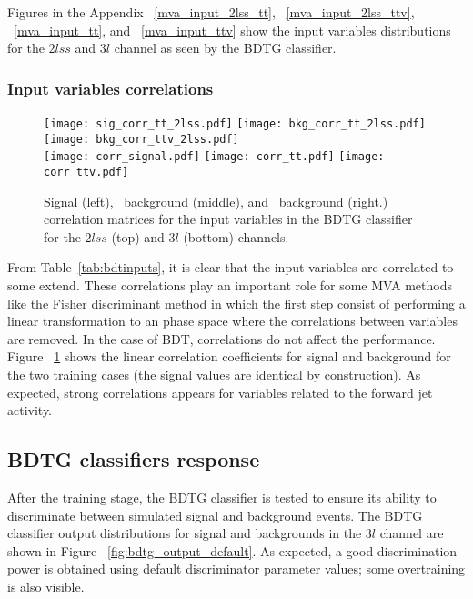 Figures in the Appendix ~\ref{mva_input_2lss_tt}, ~\ref{mva_input_2lss_ttv}, ~\ref{mva_input_tt}, and ~\ref{mva_input_ttv} show the input variables distributions for the $2lss$ and $3l$ channel as seen by the BDTG classifier. 

\subsubsection*{Input variables correlations}

\begin{figure} [!ht]
  \centering
      \texttt{[image: sig\_corr\_tt\_2lss.pdf]}
      \texttt{[image: bkg\_corr\_tt\_2lss.pdf]}
      \texttt{[image: bkg\_corr\_ttv\_2lss.pdf]}\\
      \texttt{[image: corr\_signal.pdf]}
      \texttt{[image: corr\_tt.pdf]}
      \texttt{[image: corr\_ttv.pdf]}
\caption[Correlation matrices for the BDT input variables.]{ Signal (left), \ttbar\ background (middle), and \ttV\ background (right.) correlation matrices for the input variables in the BDTG classifier for the $2lss$ (top) and  $3l$ (bottom) channels.}
\label{mva_corr}
\end{figure}

From Table~\ref{tab:bdtinputs}, it is clear that the input variables are correlated to some extend. These correlations play an important role for some MVA methods like the Fisher discriminant method in which the first step consist of performing a linear transformation to an phase space where the correlations between variables are removed. In the case of BDT, correlations do not affect the performance. Figure ~\ref{mva_corr} shows the linear correlation coefficients for signal and background for the two training cases (the signal values are identical by construction). As expected, strong correlations appears for variables related to the forward jet activity.

\subsection{BDTG classifiers response}

After the training stage, the BDTG classifier is tested to ensure its ability to discriminate between simulated signal and background events. The BDTG classifier output distributions for signal and backgrounds in the $3l$ channel are shown in Figure ~\ref{fig:bdtg_output_default}. As expected, a good discrimination power is obtained using default discriminator parameter values; some overtraining is also visible.

